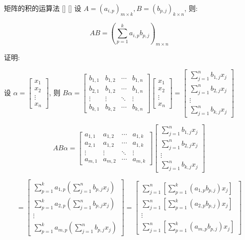 \documentclass[UTF8]{ctexart}
\DeclareMathOperator{\0}{\mathbf{0}}
\DeclareMathOperator{\<}{\langle}
\renewcommand{\>}{\rangle}
\begin{document}
		\begin{thm}
			[]
			{矩阵的积的运算法}
			[]
			[]
			设 \(A=(a_{i,p})_{m\times k}, B=(b_{p,j})_{k\times n}\), 则:
			
			\[AB=(\sum_{p=1}^{k}a_{i,p}b_{p,j})_{m\times n}\]
		\end{thm}
		\begin{prf}
		证明: 
			
			设 \(\alpha=\begin{bmatrix}x_1\\x_2\\\vdots\\x_n\end{bmatrix}\), 则 \(B\alpha=
			\begin{bmatrix}
				b_{1,1}&b_{1,2}&\cdots&b_{1,n}\\
				b_{2,1}&b_{1,2}&\cdots&b_{1,n}\\
				\vdots&\vdots&\ddots&\vdots\\
				b_{k,1}&b_{k,2}&\cdots&b_{k,n}
			\end{bmatrix}
			\begin{bmatrix}
			x_1\\x_2\\\vdots\\x_n
			\end{bmatrix}=
			\begin{bmatrix}
			\sum_{j=1}^{n}b_{1,j}x_j\\\sum_{j=1}^{n}b_{2,j}x_j\\\vdots\\\sum_{j=1}^{n}b_{k,j}x_j
			\end{bmatrix}\) 
			
			\[
			AB\alpha=
			\begin{bmatrix}
				a_{1,1}&a_{1,2}&\cdots&a_{1,k}\\
				a_{2,1}&a_{1,2}&\cdots&a_{1,k}\\
				\vdots&\vdots&\ddots&\vdots\\
				a_{m,1}&a_{m,2}&\cdots&a_{m,k}
			\end{bmatrix}
			\begin{bmatrix}
				\sum_{j=1}^{n}b_{1,j}x_j\\\sum_{j=1}^{n}b_{2,j}x_j\\\vdots\\\sum_{j=1}^{n}b_{k,j}x_j
			\end{bmatrix}
			\]
			
			\[
			=\begin{bmatrix}
				\sum_{p=1}^{k}a_{1,p}(\sum_{j=1}^{n}b_{p,j}x_j)\\
				\sum_{p=1}^{k}a_{2,p}(\sum_{j=1}^{n}b_{p,j}x_j)\\
				\vdots\\
				\sum_{p=1}^{k}a_{m,p}(\sum_{j=1}^{n}b_{p,j}x_j)
			\end{bmatrix}
			=\begin{bmatrix}
				\sum_{j=1}^{n}[\sum_{p=1}^{k}(a_{1,p}b_{p,j})x_j]\\
				\sum_{j=1}^{n}[\sum_{p=1}^{k}(a_{2,p}b_{p,j})x_j]\\
				\vdots\\
				\sum_{j=1}^{n}[\sum_{p=1}^{k}(a_{m,p}b_{p,j})x_j]
			\end{bmatrix}
			\]
			

\end{prf}
\end{document}
